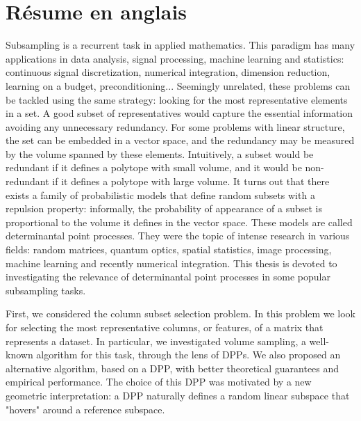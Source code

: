 \documentclass[twoside,11pt]{book}
\numberwithin{theorem}{chapter}
\numberwithin{definition}{chapter}
\numberwithin{proposition}{chapter}
\numberwithin{corollary}{chapter}
\numberwithin{example}{chapter}
\numberwithin{lemma}{chapter}
\numberwithin{assumption}{chapter}
\numberwithin{equation}{chapter}
\numberwithin{figure}{chapter}
\begin{document}
\section{Résume en anglais}

Subsampling is a recurrent task in applied mathematics. This paradigm has many applications in data analysis, signal processing, machine learning and statistics: continuous signal discretization, numerical integration, dimension reduction, learning on a budget, preconditioning... Seemingly unrelated, these problems can be tackled using the same strategy: looking for the most representative elements in a set. 
A good subset of representatives would capture the essential information avoiding any unnecessary redundancy. For some problems with linear structure, the set can be embedded in a vector space, and 
 the redundancy may be measured by the volume spanned by these elements. Intuitively, a subset would be redundant if it defines a polytope with small volume, and it would be non-redundant if it defines a polytope with large volume. It turns out that there exists a family of probabilistic models that define random subsets with a repulsion property: informally, the probability of appearance of a subset is proportional to the volume it defines in the vector space. These models are called determinantal point processes. They were
 the topic of intense research in various fields: random matrices, quantum optics, spatial statistics, image processing, machine learning and recently numerical integration. 
This thesis is devoted to investigating the relevance of determinantal point processes in some popular subsampling tasks.

First, we considered the column subset selection problem. In this problem we look for selecting the most representative columns, or features, of a matrix that represents a dataset. In particular, we investigated volume sampling, a well-known algorithm for this task, through the lens of DPPs. We also proposed an alternative algorithm, based on a DPP, with better theoretical guarantees and empirical performance. The choice of this DPP was motivated by a new geometric interpretation: a DPP naturally defines a random linear subspace that "hovers" around a reference  subspace. 
\end{document}
